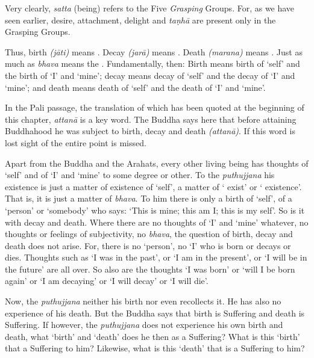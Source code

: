 Very clearly, \emph{satta} (being) refers to the Five \emph{Grasping} Groups. For, as we have seen earlier, desire, attachment, delight and \emph{taṇhā} are present only in the Grasping Groups.

Thus, birth \emph{(jāti)} means . Decay \emph{(jarā)} means . Death \emph{(marana)} means . Just as much as \emph{bhava} means the . Fundamentally, then: Birth means birth of `self' and the birth of `I' and `mine'; decay means decay of `self' and the decay of `I' and `mine'; and death means death of `self' and the death of `I' and `mine'.

In the Pali passage, the translation of which has been quoted at the beginning of this chapter, \emph{attanā} is a key word. The Buddha says here that before attaining Buddhahood he was subject to birth, decay and death  \emph{(attanā)}. If this word is lost sight of the entire point is missed.

Apart from the Buddha and the Arahats, every other living being has thoughts of `self' and of `I' and `mine' to some degree or other. To the \emph{puthujjana} his existence is just a matter of existence of `self', a matter of ` exist' or ` existence'. That is, it is just a matter of \emph{bhava}. To him there is only a birth of `self', of a `person' or `somebody' who says: `This is mine; this am I; this is my self'. So is it with decay and death. Where there are no thoughts of `I' and `mine' whatever, no thoughts or feelings of subjectivity, no \emph{bhava}, the question of birth, decay and death does not arise. For, there is no `person', no `I' who is born or decays or dies. Thoughts such as `I was in the past', or `I am in the present', or `I will be in the future' are all over. So also are the thoughts `I was born' or `will I be born again' or `I am decaying' or `I will decay' or `I will die'.

Now, the \emph{puthujjana} neither  his birth nor even recollects it. He has also no experience of his death. But the Buddha says that birth is Suffering and death is Suffering. If however, the \emph{puthujjana} does not experience his own birth and death, what `birth' and `death' does he then  as a Suffering? What is this `birth' that  a Suffering to him? Likewise, what is this `death' that is a Suffering to him?


